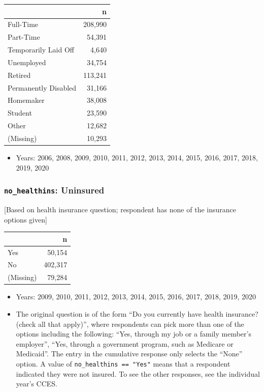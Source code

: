 \documentclass[10pt,article,oneside]{memoir}
\theoremstyle{definition}
\begin{document}
\begin{table}[H]
\centering
\begin{tabular}{lr}
\toprule
 & n\\
\midrule
Full-Time & 208,990\\
Part-Time & 54,391\\
Temporarily Laid Off & 4,640\\
Unemployed & 34,754\\
Retired & 113,241\\
Permanently Disabled & 31,166\\
Homemaker & 38,008\\
Student & 23,590\\
Other & 12,682\\
(Missing) & 10,293\\
\bottomrule
\end{tabular}
\end{table}

\begin{itemize}
\tightlist
\item
  Years: 2006, 2008, 2009, 2010, 2011, 2012, 2013, 2014, 2015, 2016,
  2017, 2018, 2019, 2020
\end{itemize}

\hypertarget{no_healthins-uninsured}{%
\subsubsection{\texorpdfstring{\texttt{no\_healthins}:
Uninsured}{no\_healthins: Uninsured}}\label{no_healthins-uninsured}}

{[}Based on health insurance question; respondent has none of the
insurance options given{]}

\begin{table}[H]
\centering
\begin{tabular}{lr}
\toprule
 & n\\
\midrule
Yes & 50,154\\
No & 402,317\\
(Missing) & 79,284\\
\bottomrule
\end{tabular}
\end{table}

\begin{itemize}
\tightlist
\item
  Years: 2009, 2010, 2011, 2012, 2013, 2014, 2015, 2016, 2017, 2018,
  2019, 2020
\item
  The original question is of the form ``Do you currently have health
  insurance? (check all that apply)'', where respondents can pick more
  than one of the options including the following: ``Yes, through my job
  or a family member's employer'', ``Yes, through a government program,
  such as Medicare or Medicaid''. The entry in the cumulative response
  only selects the ``None'' option. A value of
  \texttt{no\_healthins\ ==\ "Yes"} means that a respondent indicated
  they were not insured. To see the other responses, see the individual
  year's CCES.
\end{itemize}
\end{document}

